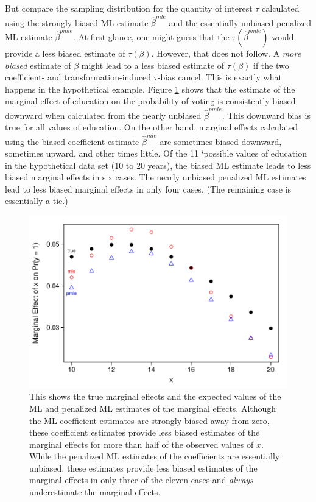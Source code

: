 \documentclass[12pt]{article}
\begin{document}
But compare the sampling distribution for the quantity of interest $\tau$ calculated using the strongly biased ML estimate $\hat{\beta}^{mle}$ and the essentially unbiased penalized ML estimate $\hat{\beta}^{pmle}$. At first glance, one might guess that the $\tau(\hat{\beta}^{pmle})$ would provide a less biased estimate of $\tau(\beta)$. However, that does not follow. A \textit{more biased} estimate of $\beta$ might lead to a less biased estimate of $\tau(\beta)$ if the two coefficient- and transformation-induced $\tau$-bias cancel. This is exactly what happens in the hypothetical example. Figure \ref{fig:logit-me-bias} shows that the estimate of the marginal effect of education on the probability of voting is consistently biased downward when calculated from the nearly unbiased $\hat{\beta}^{pmle}$. This downward bias is true for all values of education. On the other hand, marginal effects calculated using the biased coefficient estimate $\hat{\beta}^{mle}$ are sometimes biased downward, sometimes upward, and other times little. Of the 11 `possible values of education in the hypothetical data set (10 to 20 years), the biased ML estimate leads to less biased marginal effects in six cases. The nearly unbiased penalized ML estimates lead to less biased marginal effects in only four cases. (The remaining case is essentially a tie.)

\begin{figure}[h!]
\begin{center}
\includegraphics[scale = 0.7]{figs/logit-me-bias.pdf}
\caption{This shows the true marginal effects and the expected values of the ML and penalized ML estimates of the marginal effects. Although the ML coefficient estimates are strongly biased away from zero, these coefficient estimates provide less biased estimates of the marginal effects for more than half of the observed values of $x$. While the penalized ML estimates of the coefficients are essentially unbiased, these estimates provide less biased estimates of the marginal effects in only three of the eleven cases and \textit{always} underestimate the marginal effects.}\label{fig:logit-me-bias}
\end{center}
\end{figure}
\end{document}
